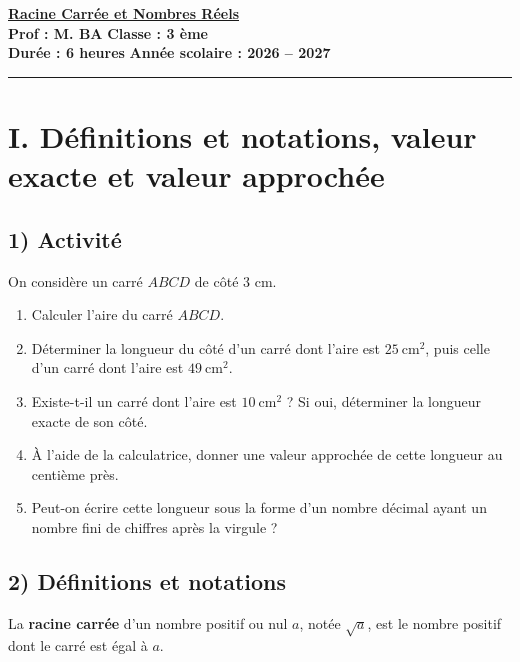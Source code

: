 \documentclass[12pt,a4paper]{article}
\begin{document}
\begin{center}
    \Large\textbf{\underline{\textcolor{myred}{Racine Carrée et Nombres Réels}}}\\[0.2cm]
    \normalsize\textbf{Prof : M. BA} \hfill \textbf{Classe : 3 ème}\\[0.1cm]
    \textbf{Durée : 6 heures} \hfill \textbf{Année scolaire : 2026 -- 2027}
\end{center}
\hrule
\vspace{0.3cm}

\section*{\color{myred}I. Définitions et notations, valeur exacte et valeur approchée}


\subsection*{\color{myred}1) Activité}

On considère un carré $ABCD$ de côté $3$ cm.

\begin{enumerate}[label=\textbf{\arabic*.}]
    \item Calculer l'aire du carré $ABCD$.
    \item Déterminer la longueur du côté d'un carré dont l'aire est
    $25\ \text{cm}^2$, puis celle d'un carré dont l'aire est
    $49\ \text{cm}^2$.
    \item Existe-t-il un carré dont l'aire est $10\ \text{cm}^2$ ?
    Si oui, déterminer la longueur exacte de son côté.
    \item À l'aide de la calculatrice, donner une valeur approchée
    de cette longueur au centième près.
    \item Peut-on écrire cette longueur sous la forme d'un nombre
    décimal ayant un nombre fini de chiffres après la virgule ?
\end{enumerate}

\subsection*{\color{myred} 2) Définitions et notations}

\begin{tcolorbox}[colback=red!5!white,colframe=myred,title=]
La \textbf{racine carrée} d'un nombre positif ou nul $a$,
notée $\sqrt{a}$, est le nombre positif dont le carré est égal à $a$.
\end{tcolorbox}
\end{document}
